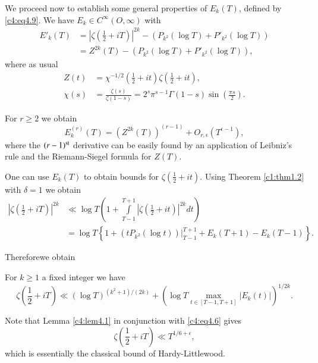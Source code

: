 We proceed now to establish some general properties of $E_k (T)$,
defined by \eqref{c4:eq4.9}. We have $E_k \in C^\infty (O, \infty)$
with 
\begin{align*}
  E'_k (T) & = \left|\zeta \left(\frac{1}{2} + iT \right)\right|^{2k} -
  \left(P_{k^2}(\log T) + P'_{k^2} (\log T)\right)\\
  & = Z^{2k}(T) - \left(P_{k^2}(\log T) + P'_{k^2} (\log T)\right),
\end{align*}
where as usual
\begin{align*}
  Z(t) & = \chi^{-1/2} \left(\frac{1}{2} + it \right) \zeta
  \left(\frac{1}{2} + it \right),\\
  \chi (s) & = \frac{\zeta(s)}{\zeta (1-s)} = 2^s \pi^{s-1} \Gamma
  (1-s) \sin \left(\frac{\pi s}{2} \right).
\end{align*}

For $r \geq 2$ we obtain
$$
E_k^{(r)} (T) = (Z^{2k}(T))^{(r-1)} + O_{r, \epsilon} (T^{\epsilon-1}),
$$
where the $(r-1)^{\rm st}$ derivative can be easily found by an application
of Leibniz's rule and the Riemann-Siegel formula for $Z(T)$. 

One can use $E_k (T)$ to obtain bounds for $\zeta \left(\frac{1}{2} +
it \right)$. Using Theorem \ref{c1:thm1.2} with $\delta=1$ we obtain 
\begin{align*}
  \left|\zeta \left(\frac{1}{2}+ iT \right)\right|^{2k} & \ll \log T \left( 1+
  \int\limits_{T-1}^{T+1} \left|\zeta \left(\frac{1}{2} + it
  \right)\right|^{2k}dt\right)\\
  & = \log T \left\{ 1+ \left(t P_{k^2} (\log t)\right)\Bigg|_{T-1}^{T+1}+ E_k
  (T+1) - E_k (T-1)\right\}.
\end{align*}

Therefore\pageoriginale we obtain
\begin{lemma}\label{c4:lem4.1}
  For $k \geq 1$ a fixed integer we have
  \begin{equation}
    \zeta \left(\frac{1}{2} + iT\right) \ll (\log T)^{(k^2 +1)/(2k)}+
    \left(\log T \max_{t \in [T - 1, T+1]}|E_k (t) |
    \right)^{1/2k}.\label{c4:eq4.13} 
  \end{equation}
\end{lemma}

Note that Lemma \ref{c4:lem4.1} in conjunction with \eqref{c4:eq4.6}
gives 
\begin{equation}
  \zeta \left(\frac{1}{2} + iT \right) \ll T^{1/6+
    \epsilon}, \label{c4:eq4.14} 
\end{equation}
which is essentially the classical bound of Hardy-Littlewood.

